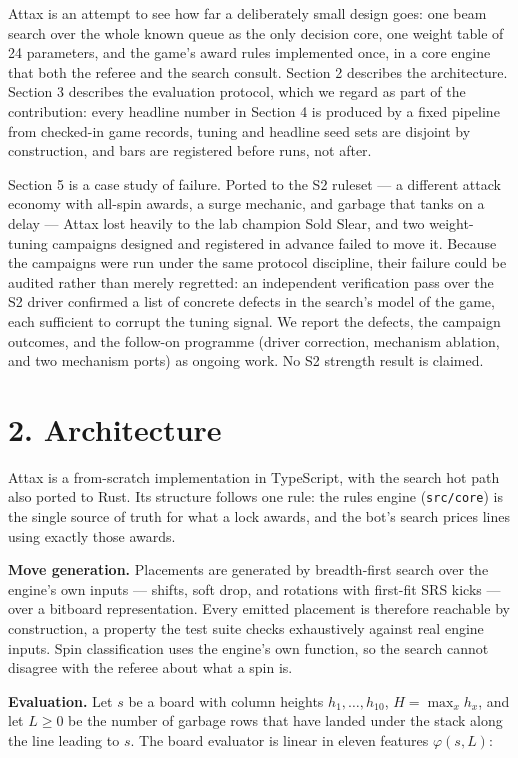 \documentclass[
  11pt,
]{article}
\begin{document}
Attax is an attempt to see how far a deliberately small design goes: one
beam search over the whole known queue as the only decision core, one
weight table of 24 parameters, and the game's award rules implemented
once, in a core engine that both the referee and the search consult.
Section 2 describes the architecture. Section 3 describes the evaluation
protocol, which we regard as part of the contribution: every headline
number in Section 4 is produced by a fixed pipeline from checked-in game
records, tuning and headline seed sets are disjoint by construction, and
bars are registered before runs, not after.

Section 5 is a case study of failure. Ported to the S2 ruleset --- a
different attack economy with all-spin awards, a surge mechanic, and
garbage that tanks on a delay --- Attax lost heavily to the lab champion
Sold Slear, and two weight-tuning campaigns designed and registered in
advance failed to move it. Because the campaigns were run under the same
protocol discipline, their failure could be audited rather than merely
regretted: an independent verification pass over the S2 driver confirmed
a list of concrete defects in the search's model of the game, each
sufficient to corrupt the tuning signal. We report the defects, the
campaign outcomes, and the follow-on programme (driver correction,
mechanism ablation, and two mechanism ports) as ongoing work. No S2
strength result is claimed.

\section{2. Architecture}\label{architecture}

Attax is a from-scratch implementation in TypeScript, with the search
hot path also ported to Rust. Its structure follows one rule: the rules
engine (\texttt{src/core}) is the single source of truth for what a lock
awards, and the bot's search prices lines using exactly those awards.

\textbf{Move generation.} Placements are generated by breadth-first
search over the engine's own inputs --- shifts, soft drop, and rotations
with first-fit SRS kicks --- over a bitboard representation. Every
emitted placement is therefore reachable by construction, a property the
test suite checks exhaustively against real engine inputs. Spin
classification uses the engine's own function, so the search cannot
disagree with the referee about what a spin is.

\textbf{Evaluation.} Let \(s\) be a board with column heights
\(h_1, \dots, h_{10}\), \(H = \max_x h_x\), and let \(L \ge 0\) be the
number of garbage rows that have landed under the stack along the line
leading to \(s\). The board evaluator is linear in eleven features
\(\varphi(s, L)\):
\end{document}
